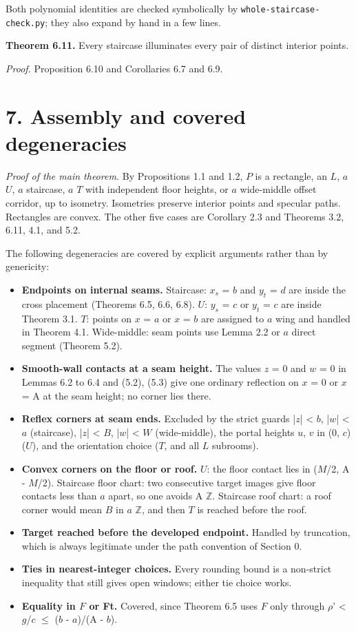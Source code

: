 \documentclass[11pt]{article}
\newcommand{\Beta}{B}
\begin{document}
Both polynomial identities are checked symbolically by \texttt{whole-staircase-check.py}; they also expand by hand in a few lines.

\textbf{Theorem 6.11.} Every staircase illuminates every pair of distinct interior points.

\emph{Proof.} Proposition 6.10 and Corollaries 6.7 and 6.9.

\section*{7. Assembly and covered degeneracies}
\emph{Proof of the main theorem.} By Propositions 1.1 and 1.2, \(P\) is a rectangle, an \(L\), \(a\) \(U\), \(a\) staircase, \(a\) \(T\) with independent floor heights, or \(a\) wide-middle offset corridor, up to isometry. Isometries preserve interior points and specular paths. Rectangles are convex. The other five cases are Corollary 2.3 and Theorems 3.2, 6.11, 4.1, and 5.2.

The following degeneracies are covered by explicit arguments rather than by genericity:

\begin{itemize}
\item \textbf{Endpoints on internal seams.} Staircase: \(x_{s}\) = \(b\) and \(y_{t}\) = \(d\) are inside the cross placement (Theorems 6.5, 6.6, 6.8). \(U\): \(y_{s}\) = \(c\) or \(y_{t}\) = \(c\) are inside Theorem 3.1. \(T\): points on \(x\) = \(a\) or \(x\) = \(b\) are assigned to \(a\) wing and handled in Theorem 4.1. Wide-middle: seam points use Lemma 2.2 or \(a\) direct segment (Theorem 5.2).
\item \textbf{Smooth-wall contacts at a seam height.} The values \(z\) = 0 and \(w\) = 0 in Lemmas 6.2 to 6.4 and (5.2), (5.3) give one ordinary reflection on \(x\) = 0 or \(x\) = A at the seam height; no corner lies there.
\item \textbf{Reflex corners at seam ends.} Excluded by the strict guards |\(z\)| < \(b\), |\(w\)| < \(a\) (staircase), |\(z\)| < \(B\), |\(w\)| < \(W\) (wide-middle), the portal heights \(u\), \(v\) in (0, \(c\)) (\(U\)), and the orientation choice (\(T\), and all \(L\) subrooms).
\item \textbf{Convex corners on the floor or roof.} \(U\): the floor contact lies in (\(M\)/2, A - \(M\)/2). Staircase floor chart: two consecutive target images give floor contacts less than \(a\) apart, so one avoids A \(\mathbb{Z}\). Staircase roof chart: a roof corner would mean \(\Beta\) in \(a\) \(\mathbb{Z}\), and then \(T\) is reached before the roof.
\item \textbf{Target reached before the developed endpoint.} Handled by truncation, which is always legitimate under the path convention of Section 0.
\item \textbf{Ties in nearest-integer choices.} Every rounding bound is a non-strict inequality that still gives open windows; either tie choice works.
\item \textbf{Equality in \(F\) or Ft.} Covered, since Theorem 6.5 uses \(F\) only through \(\rho\)' < \(g\)/\(c\) \(\le\) (\(b\) - \(a\))/(A - \(b\)).
\end{itemize}
\end{document}

